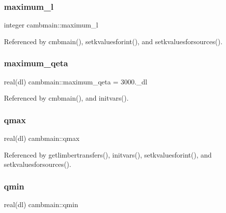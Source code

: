 \mbox{\label{namespacecambmain_acb0277d55c225aee4dcfca123a3631a2}} 
\subsubsection{\texorpdfstring{maximum\+\_\+l}{maximum\_l}}
{\footnotesize\ttfamily integer cambmain\+::maximum\+\_\+l\hspace{0.3cm}{\ttfamily [private]}}



Referenced by cmbmain(), setkvaluesforint(), and setkvaluesforsources().

\mbox{\label{namespacecambmain_a538fac0cbeacb9f2daa7bd638e3ca806}} 
\subsubsection{\texorpdfstring{maximum\+\_\+qeta}{maximum\_qeta}}
{\footnotesize\ttfamily real(dl) cambmain\+::maximum\+\_\+qeta = 3000.\+\_\+dl\hspace{0.3cm}{\ttfamily [private]}}



Referenced by cmbmain(), and initvars().

\mbox{\label{namespacecambmain_abb9b39e7c9db24515f7e239e94831b1b}} 
\subsubsection{\texorpdfstring{qmax}{qmax}}
{\footnotesize\ttfamily real(dl) cambmain\+::qmax\hspace{0.3cm}{\ttfamily [private]}}



Referenced by getlimbertransfers(), initvars(), setkvaluesforint(), and setkvaluesforsources().

\mbox{\label{namespacecambmain_a5c0dcf87d7d21c1159e4eccad5b679ef}} 
\subsubsection{\texorpdfstring{qmin}{qmin}}
{\footnotesize\ttfamily real(dl) cambmain\+::qmin\hspace{0.3cm}{\ttfamily [private]}}



